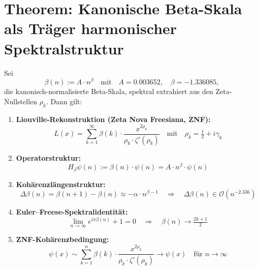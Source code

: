\documentclass{article}
\begin{document}
\section*{Theorem: Kanonische Beta-Skala als Träger harmonischer Spektralstruktur}

Sei  
\[
\boxed{\beta(n) := A \cdot n^{\beta}} \quad \text{mit} \quad A = 0.003652, \quad \beta = -1.336085,
\]  
die kanonisch-normalisierte Beta-Skala, spektral extrahiert aus den Zeta-Nullstellen \( \rho_k \). Dann gilt:

\begin{enumerate}
    \item \textbf{Liouville-Rekonstruktion (Zeta Nova Freesiana, ZNF):}
    \[
    L(x) = \sum_{k=1}^{\infty} \beta(k) \cdot \frac{x^{2\rho_k}}{\rho_k \cdot \zeta'(\rho_k)} \quad \text{mit} \quad \rho_k = \tfrac{1}{2} + i\gamma_k
    \]

    \item \textbf{Operatorstruktur:}
    \[
    H_\beta \psi(n) := \beta(n) \cdot \psi(n) = A \cdot n^{\beta} \cdot \psi(n)
    \]

    \item \textbf{Kohärenzlängenstruktur:}
    \[
    \Delta \beta(n) = \beta(n+1) - \beta(n) \approx -\alpha \cdot n^{\beta - 1}
    \quad \Rightarrow \quad \Delta \beta(n) \in \mathcal{O}(n^{-2.336})
    \]

    \item \textbf{Euler--Freese-Spektralidentität:}
    \[
    \boxed{
    \lim_{n \to \infty} e^{i\pi \beta(n)} + 1 = 0
    }
    \quad \Rightarrow \quad \beta(n) \to \tfrac{2k+1}{2}
    \]

    \item \textbf{ZNF-Kohärenzbedingung:}
    \[
    \boxed{
    \psi(x) \sim \sum_{k=1}^n \beta(k) \cdot \frac{x^{2\rho_k}}{\rho_k \cdot \zeta'(\rho_k)} \to \psi(x)
    }
    \quad \text{für } n \to \infty
    \]
\end{enumerate}
\end{document}
